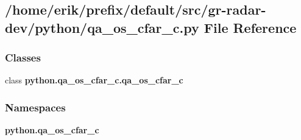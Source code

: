 \subsection{/home/erik/prefix/default/src/gr-\/radar-\/dev/python/qa\+\_\+os\+\_\+cfar\+\_\+c.py File Reference}
\label{qa__os__cfar__c_8py}
\subsubsection*{Classes}
\begin{DoxyCompactItemize}
\item 
class {\bf python.\+qa\+\_\+os\+\_\+cfar\+\_\+c.\+qa\+\_\+os\+\_\+cfar\+\_\+c}
\end{DoxyCompactItemize}
\subsubsection*{Namespaces}
\begin{DoxyCompactItemize}
\item 
 {\bf python.\+qa\+\_\+os\+\_\+cfar\+\_\+c}
\end{DoxyCompactItemize}
